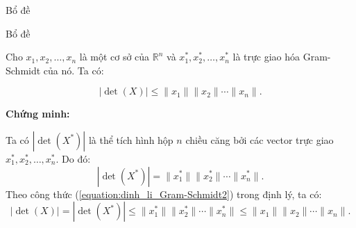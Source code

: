 \begin{frame}{Bổ đề}

\begin{block}{Bổ đề}\label{BD1}

Cho $x_1, x_2, \ldots, x_n$ là một cơ sở của $\mathbb{R}^n$
và $x_1^*, x_2^*, \ldots, x_n^*$ là trực giao hóa Gram-Schmidt của nó.
Ta có:

\[
|\det(X)| \leq \|x_1\|\|x_2\|\cdots\|x_n\|.
\]

\end{block}

\textbf{Chứng minh:}

Ta có $|\det(X^*)|$ là thể tích hình hộp $n$ chiều căng bởi các vector trực giao $x_1^*, x_2^*, \ldots, x_n^*$. Do đó:
\[
|\det(X^*)| = \|x_1^*\|\|x_2^*\|\cdots\|x_n^*\|.
\]
Theo công thức (\ref{equation:dinh_li_Gram-Schmidt2}) trong định lý, ta có:
\[
|\det(X)| = |\det(X^*)| \leq \|x_1^*\|\|x_2^*\|\cdots\|x_n^*\| \leq \|x_1\|\|x_2\|\cdots\|x_n\|.
\]

\end{frame}





